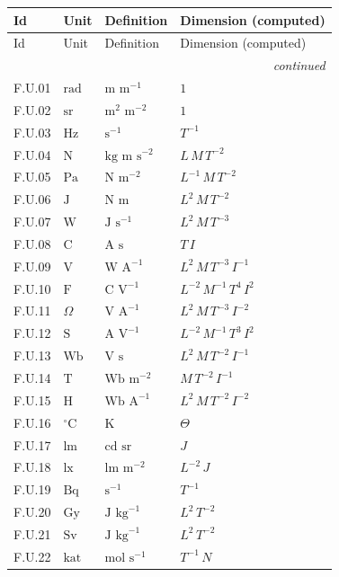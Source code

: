 {\small\setlength{\tabcolsep}{6pt}
\begin{longtable}{@{}llll@{}}
\toprule
Id & Unit & Definition & Dimension (computed) \\
\midrule\endfirsthead
\toprule
Id & Unit & Definition & Dimension (computed) \\
\midrule\endhead
\midrule\multicolumn{4}{r}{\emph{continued}}\\\endfoot
\bottomrule\endlastfoot
F.U.01 & $\mathrm{rad}$ & $\mathrm{m}$ $\mathrm{m}^{-1}$ & $1$ \\
F.U.02 & $\mathrm{sr}$ & $\mathrm{m}^{2}$ $\mathrm{m}^{-2}$ & $1$ \\
F.U.03 & $\mathrm{Hz}$ & $\mathrm{s}^{-1}$ & $T^{-1}$ \\
F.U.04 & $\mathrm{N}$ & $\mathrm{kg}$ $\mathrm{m}$ $\mathrm{s}^{-2}$ & $L\,M\,T^{-2}$ \\
F.U.05 & $\mathrm{Pa}$ & $\mathrm{N}$ $\mathrm{m}^{-2}$ & $L^{-1}\,M\,T^{-2}$ \\
F.U.06 & $\mathrm{J}$ & $\mathrm{N}$ $\mathrm{m}$ & $L^{2}\,M\,T^{-2}$ \\
F.U.07 & $\mathrm{W}$ & $\mathrm{J}$ $\mathrm{s}^{-1}$ & $L^{2}\,M\,T^{-3}$ \\
F.U.08 & $\mathrm{C}$ & $\mathrm{A}$ $\mathrm{s}$ & $T\,I$ \\
F.U.09 & $\mathrm{V}$ & $\mathrm{W}$ $\mathrm{A}^{-1}$ & $L^{2}\,M\,T^{-3}\,I^{-1}$ \\
F.U.10 & $\mathrm{F}$ & $\mathrm{C}$ $\mathrm{V}^{-1}$ & $L^{-2}\,M^{-1}\,T^{4}\,I^{2}$ \\
F.U.11 & $\Omega$ & $\mathrm{V}$ $\mathrm{A}^{-1}$ & $L^{2}\,M\,T^{-3}\,I^{-2}$ \\
F.U.12 & $\mathrm{S}$ & $\mathrm{A}$ $\mathrm{V}^{-1}$ & $L^{-2}\,M^{-1}\,T^{3}\,I^{2}$ \\
F.U.13 & $\mathrm{Wb}$ & $\mathrm{V}$ $\mathrm{s}$ & $L^{2}\,M\,T^{-2}\,I^{-1}$ \\
F.U.14 & $\mathrm{T}$ & $\mathrm{Wb}$ $\mathrm{m}^{-2}$ & $M\,T^{-2}\,I^{-1}$ \\
F.U.15 & $\mathrm{H}$ & $\mathrm{Wb}$ $\mathrm{A}^{-1}$ & $L^{2}\,M\,T^{-2}\,I^{-2}$ \\
F.U.16 & ${}^\circ\mathrm{C}$ & $\mathrm{K}$ & $\Theta$ \\
F.U.17 & $\mathrm{lm}$ & $\mathrm{cd}$ $\mathrm{sr}$ & $J$ \\
F.U.18 & $\mathrm{lx}$ & $\mathrm{lm}$ $\mathrm{m}^{-2}$ & $L^{-2}\,J$ \\
F.U.19 & $\mathrm{Bq}$ & $\mathrm{s}^{-1}$ & $T^{-1}$ \\
F.U.20 & $\mathrm{Gy}$ & $\mathrm{J}$ $\mathrm{kg}^{-1}$ & $L^{2}\,T^{-2}$ \\
F.U.21 & $\mathrm{Sv}$ & $\mathrm{J}$ $\mathrm{kg}^{-1}$ & $L^{2}\,T^{-2}$ \\
F.U.22 & $\mathrm{kat}$ & $\mathrm{mol}$ $\mathrm{s}^{-1}$ & $T^{-1}\,N$ \\
\end{longtable}}
